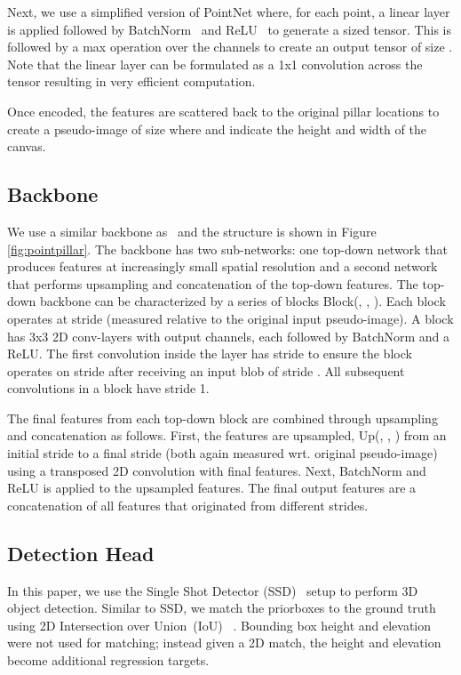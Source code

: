 \documentclass[10pt,twocolumn,letterpaper]{article}
\newcommand{\squeeze}{\vspace{-0.5mm}}
\begin{document}
Next, we use a simplified version of PointNet where, for each point, a linear layer is applied followed by BatchNorm~\cite{batchnorm} and ReLU~\cite{relu} to generate a  sized tensor. 
This is followed by a max operation over the channels to create an output tensor of size . 
Note that the linear layer can be formulated as a 1x1 convolution across the tensor resulting in very efficient computation.

\label{sec:stacked-to-pseudo}
Once encoded, the features are scattered back to the original pillar locations to create a pseudo-image of size  where  and  indicate the height and width of the canvas.

\squeeze
\subsection{Backbone}
\squeeze
We use a similar backbone as~\cite{voxelnet} and the structure is shown in Figure \ref{fig:pointpillar}.
The backbone has two sub-networks:
one top-down network that produces features at increasingly small spatial resolution and a second network that performs upsampling and concatenation of the top-down features.
The top-down backbone can be characterized by a series of blocks Block(, , ).
Each block operates at stride  (measured relative to the original input pseudo-image).
A block has  3x3 2D conv-layers with  output channels, each followed by BatchNorm and a ReLU.
The first convolution inside the layer has stride  to ensure the block operates on stride  after receiving an input blob of stride .
All subsequent convolutions in a block have stride 1.

The final features from each top-down block are combined through upsampling and concatenation as follows.
First, the features are upsampled, Up(, , ) from an initial stride  to a final stride  (both again measured wrt. original pseudo-image) using a transposed 2D convolution with  final features.
Next, BatchNorm and ReLU is applied to the upsampled features.
The final output features are a concatenation of all features that originated from different strides.

\squeeze
\subsection{Detection Head}
\squeeze
In this paper, we use the Single Shot Detector (SSD)~\cite{ssd} setup to perform 3D object detection.
Similar to SSD, we match the priorboxes to the ground truth using 2D Intersection over Union~(IoU) ~\cite{pascal}.
Bounding box height and elevation were not used for matching; instead given a 2D match, the height and elevation become additional regression targets.
\end{document}
